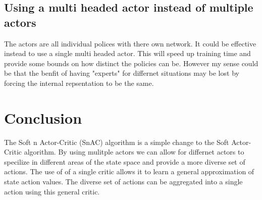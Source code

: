 \documentclass[12pt]{article}
\begin{document}
\subsection{Using a multi headed actor instead of multiple actors}
The actors are all individual polices with there own network. It could be effective instead to use a single multi headed actor. This will speed up training time and provide some bounds on how distinct the policies can be. However my sense could be that the benfit of having "experts" for differnet situations may be lost by forcing the internal repsentation to be the same.

\section{Conclusion}

The Soft n Actor-Critic (SnAC) algorithm is a simple change to the Soft Actor-Critic algorithm. By using mulitple actors we can allow for differnet actors to specilize in different areas of the state space and provide a more diverse set of actions. The use of of a single critic allows it to learn a general approximation of state action values. The diverse set of actions can be aggregated into a single action using this general critic.
\end{document}
